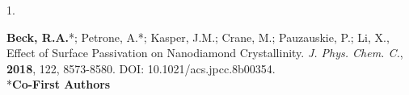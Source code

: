 \begin{cvpublications}



\cvpublication
{1.}
{\parbox[t]{0.95\textwidth}{\strut \textbf{Beck, R.A.}*; Petrone, A.*; Kasper, J.M.; Crane, M.; Pauzauskie, P.; Li, X., 
Effect of Surface Passivation on Nanodiamond Crystallinity.
\textit{J. Phys. Chem. C.}, \textbf{2018}, 122, 8573-8580.
DOI: 10.1021/acs.jpcc.8b00354. \\ \**\textbf{Co-First Authors}}}



\end{cvpublications}
